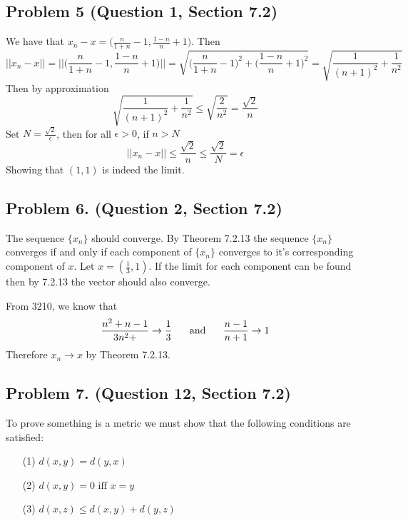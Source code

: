 \documentclass{article}
\begin{document}
\subsection*{Problem 5 (Question 1, Section 7.2)}
We have that $x_n - x = \big(\frac{n}{1+n}-1, \frac{1-n}{n}+1\big)$. Then
\[
||x_n - x|| = \bigg|\bigg|\bigg(\frac{n}{1+n}-1, \frac{1-n}{n}+1\bigg)\bigg|\bigg| = \sqrt{\bigg(\frac{n}{1+n}-1\bigg) ^2  +  \bigg(\frac{1-n}{n}+1\bigg)^2} = \sqrt{\frac{1}{(n+1)^2} + \frac{1}{n^2}}
\]
Then by approximation
\[
\sqrt{\frac{1}{(n+1)^2} + \frac{1}{n^2}} \leq \sqrt{\frac{2}{n^2}} = \frac{\sqrt{2}}{n}
\]
Set $N = \frac{\sqrt{2}}{\epsilon}$, then for all $\epsilon >0$, if $n>N$ 
\[
||x_n - x|| \leq \frac{\sqrt{2}}{n} \leq \frac{\sqrt{2}}{N} = \epsilon 
\]
Showing that $(1,1)$ is indeed the limit.
\subsection*{Problem 6. (Question 2, Section 7.2)}
The sequence $\{x_n\}$ should converge. By Theorem 7.2.13  the sequence $\{x_n\}$ converges if and only if each component of $\{x_n\}$ converges to it's corresponding component of $x$. Let $x=(\frac{1}{3}, 1)$. If the limit for each component can be found then by 7.2.13 the vector should also converge. 

From 3210, we know that
\[
\frac{n^2 + n -1}{3n^2+} \to \frac{1}{3} \hspace{.5cm}\text{ and }\hspace{.5cm} \frac{n-1}{n+1} \to 1
\]
Therefore $x_n \to x$ by Theorem 7.2.13.

\subsection*{Problem 7. (Question 12, Section 7.2)}
To prove something is a metric we must show that the following conditions are satisfied:
\begin{itemize}
	\item[(1)] $d(x,y) = d(y,x)$
	\item[(2)] $d(x,y) = 0 \text{ iff } x=y$
	\item[(3)] $d(x,z) \leq d(x,y) + d(y,z)$
\end{itemize}
\end{document}
